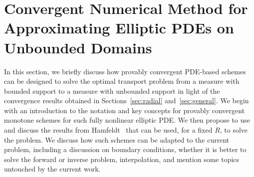 \documentclass{amsart}
\theoremstyle{lemma}
\theoremstyle{remark}
\begin{document}

\section{Convergent Numerical Method for Approximating Elliptic PDEs on Unbounded Domains}\label{sec:computation}
In this section, we briefly discuss how provably convergent PDE-based schemes can be designed to solve the optimal transport problem from a measure with bounded support to a measure with unbounded support in light of the convergence results obtained in Sections~\ref{sec:radial} and~\ref{sec:general}. We begin with an introduction to the notation and key concepts for provably convergent monotone schemes for such fully nonlinear elliptic PDE. We then propose to use and discuss the results from Hamfeldt~\cite{HamfeldtBVP2} that can be used, for a fixed $R$, to solve the problem. We discuss how such schemes can be adapted to the current problem, including a discussion on boundary conditions, whether it is better to solve the forward or inverse problem, interpolation, and mention some topics untouched by the current work.
\end{document}
